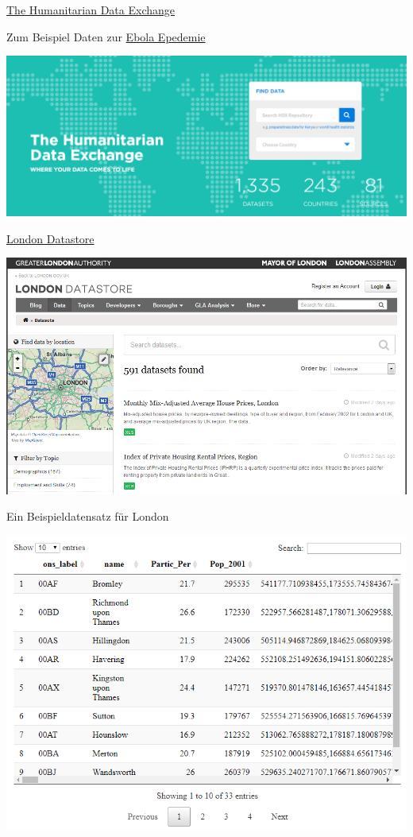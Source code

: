 \documentclass[ignorenonframetext,]{beamer}
\begin{document}
\begin{frame}{\href{data.hdx.rwlabs.org}{The Humanitarian Data
Exchange}}
\protect\hypertarget{the-humanitarian-data-exchange}{}

\begin{block}{Zum Beispiel Daten zur
\href{https://data.hdx.rwlabs.org/dataset/rowca-ebola-cases}{Ebola
Epedemie}}

\includegraphics{figure/HDx.PNG}

\end{block}

\end{frame}

\begin{frame}{\href{http://data.london.gov.uk/dataset}{London
Datastore}}
\protect\hypertarget{london-datastore}{}

\includegraphics{figure/LondonData.PNG}

\end{frame}

\begin{frame}{Ein Beispieldatensatz für London}
\protect\hypertarget{ein-beispieldatensatz-fur-london}{}

\includegraphics{figure/LondonExample.PNG}

\end{frame}
\end{document}
